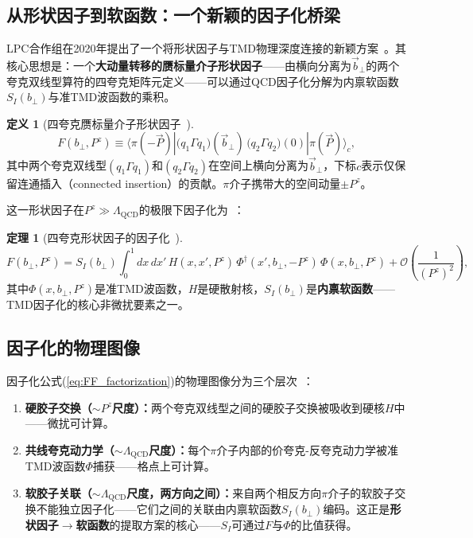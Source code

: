 \documentclass[12pt,a4paper]{ctexart}
\theoremstyle{definition}
\newtheorem{definition}{定义}[section]
\newtheorem{theorem}{定理}[section]
\begin{document}
\subsection{从形状因子到软函数：一个新颖的因子化桥梁}

LPC合作组在2020年提出了一个将形状因子与TMD物理深度连接的新颖方案~\cite{LPC2020soft}。其核心思想是：一个\textbf{大动量转移的赝标量介子形状因子}——由横向分离为$\vec b_\perp$的两个夸克双线型算符的四夸克矩阵元定义——可以通过QCD因子化分解为内禀软函数$S_I(b_\perp)$与准TMD波函数的乘积。

\begin{definition}[四夸克赝标量介子形状因子~\cite{LPC2020soft}]
\begin{equation}
\boxed{F(b_\perp, P^z) \equiv \langle \pi(-\vec P) | \big(q_1\Gamma q_1\big)(\vec b_\perp) \, \big(q_2\Gamma q_2\big)(0) | \pi(\vec P) \rangle_c},
\label{eq:four_quark_FF}
\end{equation}
其中两个夸克双线型$(q_1\Gamma q_1)$和$(q_2\Gamma q_2)$在空间上横向分离为$\vec b_\perp$，下标$c$表示仅保留连通插入（connected insertion）的贡献。$\pi$介子携带大的空间动量$\pm P^z$。
\end{definition}

这一形状因子在$P^z \gg \Lambda_{\text{QCD}}$的极限下因子化为~\cite{LPC2020soft}：

\begin{theorem}[四夸克形状因子的因子化~\cite{LPC2020soft}]
\begin{equation}
\boxed{F(b_\perp, P^z) = S_I(b_\perp) \int_0^1 dx\, dx' \, H(x, x', P^z) \, \Phi^\dagger(x', b_\perp, -P^z) \, \Phi(x, b_\perp, P^z) + \mathcal{O}\!\left(\frac{1}{(P^z)^2}\right)},
\label{eq:FF_factorization}
\end{equation}
其中$\Phi(x, b_\perp, P^z)$是准TMD波函数，$H$是硬散射核，$S_I(b_\perp)$是\textbf{内禀软函数}——TMD因子化的核心非微扰要素之一。
\end{theorem}

\subsection{因子化的物理图像}

因子化公式(\ref{eq:FF_factorization})的物理图像分为三个层次~\cite{LPC2020soft}：

\begin{enumerate}[nosep]
    \item \textbf{硬胶子交换（$\sim P^z$尺度）：}两个夸克双线型之间的硬胶子交换被吸收到硬核$H$中——微扰可计算。
    \item \textbf{共线夸克动力学（$\sim \Lambda_{\text{QCD}}$尺度）：}每个$\pi$介子内部的价夸克-反夸克动力学被准TMD波函数$\Phi$捕获——格点上可计算。
    \item \textbf{软胶子关联（$\sim \Lambda_{\text{QCD}}$尺度，两方向之间）：}来自两个相反方向$\pi$介子的软胶子交换不能独立因子化——它们之间的关联由内禀软函数$S_I(b_\perp)$编码。这正是\textbf{形状因子$\to$软函数}的提取方案的核心——$S_I$可通过$F$与$\Phi$的比值获得。
\end{enumerate}
\end{document}
